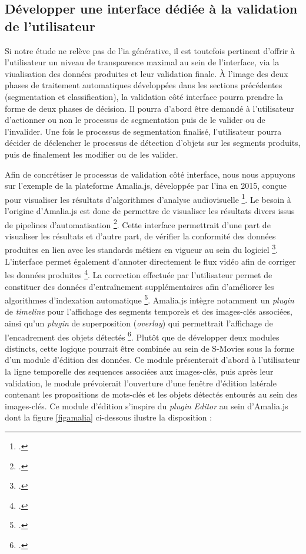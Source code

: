 \subsection{Développer une interface dédiée à la validation de l'utilisateur}
Si notre étude ne relève pas de l'\gls{ia} générative, il est toutefois pertinent d'offrir à l'utilisateur un niveau de transparence maximal au sein de l'interface, via la viualisation des données produites et leur validation finale. À l'image des deux phases de traitement automatiques développées dans les sections précédentes (segmentation et classification), la validation côté interface pourra prendre la forme de deux phases de décision. Il pourra d'abord être demandé à l'utilisateur d'actionner ou non le processus de segmentation puis de le valider ou de l'invalider. Une fois le processus de segmentation finalisé, l'utilisateur pourra décider de déclencher le processus de détection d'objets sur les segments produits, puis de finalement les modifier ou de les valider.

Afin de concrétiser le processus de validation côté interface, nous nous appuyons sur l'exemple de la plateforme Amalia.js, développée par l'\gls{ina} en 2015, conçue pour visualiser les résultats d’algorithmes d’analyse audiovisuelle \footcite{zotero-item-740}. Le besoin à l'origine d'Amalia.js est donc de permettre de visualiser les résultats divers issus de pipelines d'automatisation \footcite{herve2015}. Cette interface permettrait d'une part de visualiser les résultats et d'autre part, de vérifier la conformité des données produites en lien avec les standards métiers en vigueur au sein du logiciel \footcite{herve2015}. L'interface permet également d’annoter directement le flux vidéo afin de corriger les données produites \footcite{herve2015}. La correction effectuée par l'utilisateur  permet de constituer des données d'entraînement supplémentaires afin d'améliorer les algorithmes d'indexation automatique \footcite{herve2015}. 
Amalia.js intègre notamment un \textit{plugin} de \textit{timeline} pour l'affichage des segments temporels et des images-clés associées, ainsi qu'un \textit{plugin} de superposition (\textit{overlay}) qui permettrait l'affichage de l'encadrement des objets détectés \footcite{zotero-item-740}.
Plutôt que de développer deux modules distincts, cette logique pourrait être combinée au sein de S-Movies sous la forme d'un module d'édition des données. Ce module présenterait d'abord à l'utilisateur la ligne temporelle des \gls{sequence}s associées aux images-clés, puis après leur validation, le module prévoierait l'ouverture d'une fenêtre d'édition latérale contenant les propositions de mots-clés et les objets détectés entourés au sein des images-clés. Ce module d'édition s'inspire du \textit{plugin} \textit{Editor} au sein d'Amalia.js dont la figure \ref{figamalia} ci-dessous ilustre la disposition : 

